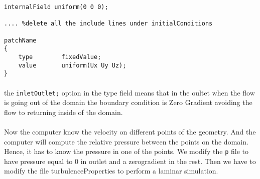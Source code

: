 \begin{lstlisting}
internalField uniform(0 0 0);

.... %delete all the include lines under initialConditions

patchName
{
	type		fixedValue;
	value 		uniform(Ux Uy Uz);
}
\end{lstlisting}

\paragraph{}the \texttt{inletOutlet;} option in the type field means that in the oultet when the flow is going out of the domain the boundary condition is Zero Gradient avoiding the flow to returning inside of the domain.
\paragraph{}Now the computer know the velocity on different points of the geometry. And the computer will compute the relative pressure between the points on the domain. Hence, it has to know the pressure in one of the points. We modify the \texttt{p} file to have pressure equal to 0 in outlet and a zerogradient in the rest. Then we have to modify the file turbulenceProperties to perform a laminar simulation. 
